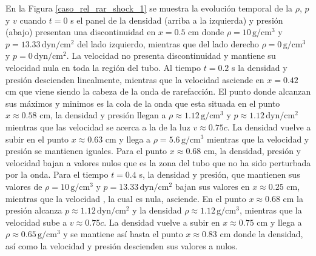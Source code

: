 \documentclass[12pt,a4paper]{book}
\begin{document}
En la Figura \ref{caso_rel_rar_shock_1} se muestra la evolución temporal de la $\rho$, $p$ y $v$
cuando $t = 0$ s el panel de la densidad 
(arriba a la izquierda) 
y presión (abajo) presentan una discontinuidad en $x = 0.5$ cm donde $\rho = 10 \,  \text{g}/ \text{cm}^3$
y $p = 13.33 \,  \text{dyn}/ \text{cm}^2 $ del lado izquierdo, mientras que del lado derecho $\rho = 0  \,  \text{g}/ \text{cm}^3$
y $p = 0 \,  \text{dyn}/ \text{cm}^2 $. La velocidad no presenta discontinuidad y mantiene su 
velocidad nula en toda la región del tubo. 
Al tiempo $t =0.2$ s la densidad y presión 
descienden linealmente, mientras que la velocidad asciende en $x = 0.42$ cm
que viene siendo la cabeza de la onda de rarefacción. El punto donde alcanzan 
sus máximos y minimos es la cola de la onda que esta situada en el punto $x \approx 0.58$ cm,
la densidad y presión llegan a $\rho \approx 1.12 \,  \text{g}/ \text{cm}^3$ y 
$p \approx 1.12\,  \text{dyn}/ \text{cm}^2 $ mientras que las velocidad
se acerca a la de la luz $v \approx 0.75c$. La densidad vuelve a subir en el punto $x \approx 0.63$ cm
y llega a $\rho = 5.6  \,  \text{g}/ \text{cm}^3$ mientras que la velocidad y presión se mantienen iguales. Para el punto
$x \approx 0.68$ cm, la densidad, presión y velocidad bajan a valores nulos que es la zona del tubo que
no ha sido perturbada por la onda.
Para el tiempo $t = 0.4$ s, la densidad y presión, que mantienen sus valores de 
$\rho = 10 \,  \text{g}/ \text{cm}^3$ y 
$p = 13.33 \,  \text{dyn}/ \text{cm}^2 $ bajan sus valores en $x \approx 0.25$ cm, mientras que la velocidad , la cual es nula,
asciende. En el punto $x \approx 0.68$ cm la presión alcanza $p \approx 1.12\,  \text{dyn}/ \text{cm}^2 $ y la densidad
$\rho \approx 1.12 \,  \text{g}/ \text{cm}^3$, mientras que la velocidad sube a $v \approx 0.75c$. 
La densidad vuelve a subir
en $x \approx 0.75$ cm y llega a $\rho \approx 0.65 \,  \text{g}/ \text{cm}^3$ y 
se mantiene así hasta el punto $x \approx 0.83$ cm
donde la densidad, así como la velocidad y presión descienden sus valores a nulos.
\end{document}
